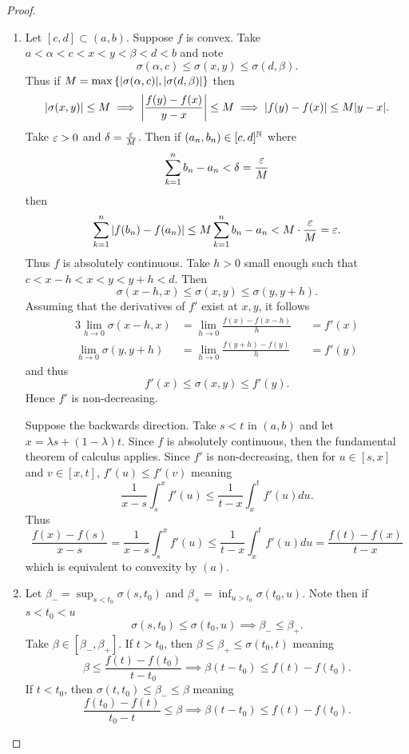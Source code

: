 \documentclass[hw_all.tex]{subfiles}
\begin{document}
\begin{proof}
\begin{enumerate}
        \item 
            Let $[c,d] \subset (a,b)$. Suppose $f$ is convex. Take $a < \alpha < c < x < y < \beta < d < b$ and note
            \[
                \sigma(\alpha, c) \leq \sigma(x,y) \leq \sigma(d, \beta)
            .\]
            Thus if $M = \max\qty{|\sigma(\alpha, c)|, |\sigma(d, \beta)|}$ then
            \[
                |\sigma(x,y)| \leq M \implies \qty|\frac{f(y) - f(x)}{y - x}| \leq M \implies |f(y) - f(x)| \leq M |y - x|
            .\]
            Take $\varepsilon > 0$ and $\delta = \frac{\varepsilon}{M}$. Then if $(a_n,b_n) \in [c,d]^{\mathbb{N}}$ where
            \[
                \sum_{k=1}^n b_n - a_n < \delta = \frac{\varepsilon}{M}
            \]
            then
            \[
                \sum_{k=1}^n |f(b_n) - f(a_n)| \leq M \sum_{k=1}^n b_n - a_n < M \cdot \frac{\varepsilon}{M} = \varepsilon
            .\]
            Thus $f$ is absolutely continuous. Take $h > 0$ small enough such that $c < x - h < x < y < y + h < d$. Then
            \[
                \sigma(x-h, x) \leq \sigma(x,y) \leq \sigma(y, y+h)
            .\]
            Assuming that the derivatives of $f'$ exist at $x,y$, it follows
            \begin{alignat*}{3}
                \lim_{h \to 0} \sigma(x-h, x) &= \lim_{h \to 0} \frac{f(x) - f(x-h)}{h} &&= f'(x) \\
                \lim_{h \to 0} \sigma(y, y+h) &= \lim_{h \to 0} \frac{f(y+h) - f(y)}{h} &&= f'(y)
            \end{alignat*}
            and thus
            \[
                f'(x) \leq \sigma(x,y) \leq f'(y)
            .\]
            Hence $f'$ is non-decreasing.


            Suppose the backwards direction. Take $s < t$ in $(a,b)$ and let $x = \lambda s + (1 - \lambda) t$. Since $f$ is absolutely continuous, then the fundamental theorem of calculus applies. Since $f'$ is non-decreasing, then for $u \in [s,x]$ and $v \in [x,t]$, $f'(u) \leq f'(v)$ meaning
            \[
                \frac{1}{x-s} \int_s^x f'(u) \leq \frac{1}{t-x} \int_x^t f'(u) du
            .\]
            Thus
            \[
               \frac{f(x) - f(s)}{x -s} = \frac{1}{x-s} \int_s^x f'(u) \leq \frac{1}{t-x} \int_x^t f'(u) du = \frac{f(t) - f(x)}{t - x}
            \]
            which is equivalent to convexity by $(a)$.

        \item 
            Let $\beta_- = \sup_{s < t_0} \sigma(s, t_0)$ and $\beta_+ = \inf_{u > t_0} \sigma(t_0, u)$. Note then if $s < t_0 < u$
            \[
                \sigma(s, t_0) \leq \sigma(t_0, u) \implies \beta_- \leq \beta_+
            .\]
            Take $\beta \in [\beta_-, \beta_+]$. If $t > t_0$, then $\beta \leq \beta_+ \leq \sigma(t_0, t)$ meaning
            \[
                \beta \leq \frac{f(t) - f(t_0)}{t - t_0} \implies \beta(t - t_0) \leq f(t) - f(t_0)
            .\]
            If $t < t_0$, then $\sigma(t, t_0) \leq \beta_- \leq \beta$ meaning
            \[
                \frac{f(t_0) - f(t)}{t_0 - t} \leq \beta \implies \beta(t - t_0) \leq f(t) - f(t_0)
            .\]


\end{enumerate}
\end{proof}
\end{document}

